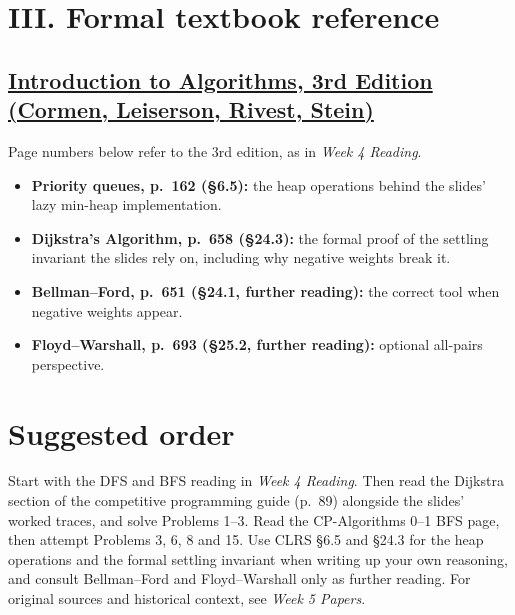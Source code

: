 \documentclass[11pt]{article}
\begin{document}
\section*{III. Formal textbook reference}
\subsection*{\href{https://www.cs.mcgill.ca/~akroit/math/compsci/Cormen\%20Introduction\%20to\%20Algorithms.pdf}{Introduction to Algorithms, 3rd Edition (Cormen, Leiserson, Rivest, Stein)}}

Page numbers below refer to the 3rd edition, as in \emph{Week 4 Reading}.
\begin{itemize}
  \item \textbf{Priority queues, p.~162 (\S6.5):} the heap operations behind the slides' lazy min-heap implementation.
  \item \textbf{Dijkstra's Algorithm, p.~658 (\S24.3):} the formal proof of the settling invariant the slides rely on, including why negative weights break it.
  \item \textbf{Bellman--Ford, p.~651 (\S24.1, further reading):} the correct tool when negative weights appear.
  \item \textbf{Floyd--Warshall, p.~693 (\S25.2, further reading):} optional all-pairs perspective.
\end{itemize}

\section*{Suggested order}
Start with the DFS and BFS reading in \emph{Week 4 Reading}. Then read the Dijkstra section of the competitive programming guide (p.~89) alongside the slides' worked traces, and solve Problems 1--3. Read the CP-Algorithms 0--1 BFS page, then attempt Problems 3, 6, 8 and 15. Use CLRS \S6.5 and \S24.3 for the heap operations and the formal settling invariant when writing up your own reasoning, and consult Bellman--Ford and Floyd--Warshall only as further reading. For original sources and historical context, see \emph{Week 5 Papers}.
\end{document}
